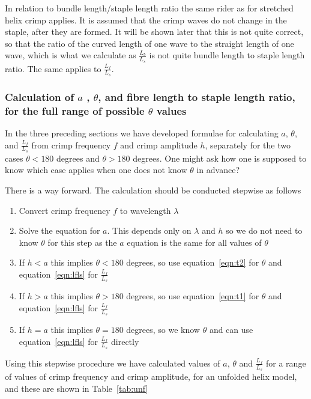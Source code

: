 \documentclass[titlepage,10pt]{article}  %
\begin{document}
In relation to bundle length/staple length ratio the same rider as for stretched helix crimp applies. It is assumed that the crimp waves do not change in the staple, after they are formed. It will be shown later that this is not quite correct, so that the ratio of the curved length of one wave to the straight length of one wave, which is what we calculate as $\frac{L_{b}}{L_{s}}$ is not quite bundle length to staple length ratio. The same applies to $\frac{L_{f}}{L_{s}}$.



\subsubsection{Calculation of $a$ , $\theta$, and fibre length to staple length ratio, for the full range of possible $\theta$ values}
\label{sec:calc}
In the three preceding sections we have developed formulae for calculating $a$, $\theta$, and $\frac{L_{f}}{L_{s}}$ from crimp frequency $f$ and crimp amplitude $h$, separately for the two cases $\theta < 180$ degrees and $\theta > 180$ degrees.  One might ask how one is supposed to know which case applies when one does not know $\theta$ in advance? 

There is a way forward. The calculation should be conducted stepwise as follows

\begin{enumerate}
\item Convert crimp frequency $f$ to wavelength $\lambda$
\item Solve the equation for $a$. This depends only on $\lambda$ and $h$ so we do not need to know $\theta$ for this step as the $a$ equation is the same for all values of $\theta$
\item If $h < a$ this implies $\theta < 180$ degrees, so use equation~\ref{eqn:t2} for $\theta$ and equation~\ref{eqn:lfls} for $\frac{L_{f}}{L_{s}}$
\item If $h > a$ this implies $\theta > 180$ degrees, so use equation~\ref{eqn:t1} for $\theta$ and equation~\ref{eqn:lfls} for $\frac{L_{f}}{L_{s}}$
\item If $h = a$ this implies $\theta = 180$ degrees, so we know $\theta$ and can use  equation~\ref{eqn:lfls} for $\frac{L_{f}}{L_{s}}$ directly
\end{enumerate}

Using this stepwise procedure we have calculated values of $a$, $\theta$ and $\frac{L_{f}}{L_{s}}$ for a range of values of crimp frequency and crimp amplitude, for an unfolded helix model, and these are shown in Table~\ref{tab:unf}
\end{document}
